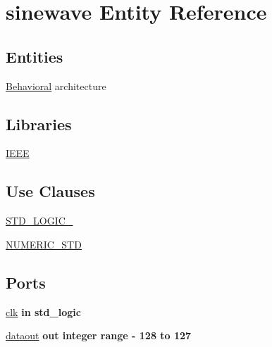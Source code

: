 \hypertarget{classsinewave}{}\section{sinewave Entity Reference}
\label{classsinewave}
\subsection*{Entities}
\begin{DoxyCompactItemize}
\item 
\hyperlink{classsinewave_1_1_behavioral}{Behavioral} architecture
\end{DoxyCompactItemize}
\subsection*{Libraries}
 \begin{DoxyCompactItemize}
\item 
\hyperlink{classsinewave_ae4f03c286607f3181e16b9aa12d0c6d4}{I\+E\+E\+E} 
\end{DoxyCompactItemize}
\subsection*{Use Clauses}
 \begin{DoxyCompactItemize}
\item 
\hyperlink{classsinewave_aa4b2b25246a821511120e3149b003563}{S\+T\+D\+\_\+\+L\+O\+G\+I\+C\+\_}   
\item 
\hyperlink{classsinewave_ae00f3f04545af57582ff10609eee23e2}{N\+U\+M\+E\+R\+I\+C\+\_\+\+S\+T\+D}   
\end{DoxyCompactItemize}
\subsection*{Ports}
 \begin{DoxyCompactItemize}
\item 
\hyperlink{classsinewave_a4a4609c199d30b3adebbeb3a01276ec5}{clk}  {\bfseries {\bfseries \textcolor{keywordflow}{in}\textcolor{vhdlchar}{ }}} {\bfseries \textcolor{comment}{std\+\_\+logic}\textcolor{vhdlchar}{ }} 
\item 
\hyperlink{classsinewave_a6f923bb55dbbef4e48f6ae28e0588faf}{dataout}  {\bfseries {\bfseries \textcolor{keywordflow}{out}\textcolor{vhdlchar}{ }}} {\bfseries \textcolor{comment}{integer}\textcolor{vhdlchar}{ }\textcolor{vhdlchar}{ }\textcolor{vhdlchar}{ }\textcolor{keywordflow}{range}\textcolor{vhdlchar}{ }\textcolor{vhdlchar}{-\/}\textcolor{vhdlchar}{ } \textcolor{vhdldigit}{128} \textcolor{vhdlchar}{ }\textcolor{keywordflow}{to}\textcolor{vhdlchar}{ }\textcolor{vhdlchar}{ } \textcolor{vhdldigit}{127} \textcolor{vhdlchar}{ }} 
\end{DoxyCompactItemize}


